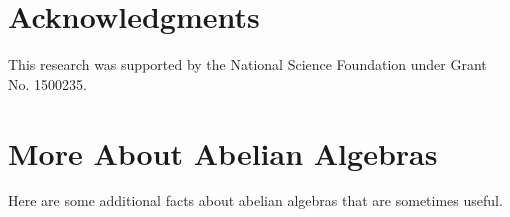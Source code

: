 \section*{Acknowledgments}
This research was supported by the National Science 
Foundation under Grant No. 1500235.






































































\appendix


\section{More About Abelian Algebras}
\label{sec:abelian-algebras}
Here are some additional facts about abelian algebras that are sometimes useful.

